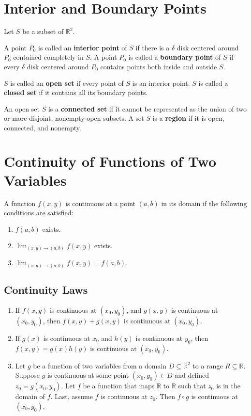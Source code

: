 \documentclass{article}
\begin{document}
\section*{Interior and Boundary Points}
Let $S$ be a subset of $\mathbb{R}^2$.
\vspace{1em}

A point $P_0$ is called an \textbf{interior point} of $S$ if there is a $\delta$ disk centered around $P_0$ contained completely in $S$. A point $P_0$ is called a \textbf{boundary point} of $S$ if every $\delta$ disk centered around $P_0$ contains points both inside and outside $S$.
\vspace{1em}

$S$ is called an \textbf{open set} if every point of $S$ is an interior point. $S$ is called a \textbf{closed set} if it contains all its boundary points.
\vspace{1em}

An open set $S$ is a \textbf{connected set} if it cannot be represented as the union of two or more disjoint, nonempty open subsets. A set $S$ is a \textbf{region} if it is open, connected, and nonempty.

\section*{Continuity of Functions of Two Variables}

A function $f(x, y)$ is continuous at a point $(a, b)$ in its domain if the following conditions are satisfied:
\begin{enumerate}
    \item $f(a, b)$ exists.
    \item $\lim_{(x, y)\rightarrow(a, b)} f(x, y)$ exists.
    \item $\lim_{(x, y)\rightarrow(a, b)} f(x, y)=f(a, b)$.
\end{enumerate}

\subsection*{Continuity Laws}
\begin{enumerate}
    \item If $f(x, y)$ is continuous at $(x_0, y_0)$, and $g(x, y)$ is continuous at $(x_0, y_0)$, then $f(x, y)+g(x, y)$ is continuous at $(x_0, y_0)$.
    \item If $g(x)$ is continuous at $x_0$ and $h(y)$ is continuous at $y_0$, then $f(x, y)=g(x)h(y)$ is continuous at $(x_0, y_0)$.
    \item Let $g$ be a function of two variables from a domain $D\subseteq\mathbb{R}^2$ to a range $R\subseteq\mathbb{R}$. Suppose $g$ is continuous at some point $(x_0, y_0)\in D$ and defined $z_0=g(x_0, y_0)$. Let $f$ be a function that maps $\mathbb{R}$ to $\mathbb{R}$ such that $z_0$ is in the domain of $f$. Last, assume $f$ is continuous at $z_0$. Then $f \circ g$ is continuous at $(x_0, y_0)$.
\end{enumerate}
\end{document}
